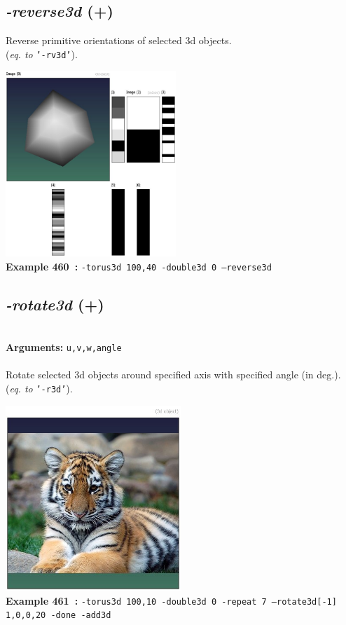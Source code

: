 \documentclass[a4paper,11pt,twoside]{book}
\begin{document}
\subsection{\emph{-reverse3d} (+)}\vspace*{-0.5em}
Reverse primitive orientations of selected 3d objects.
~\\(\emph{eq. to} {\small \texttt{'-rv3d'}}).
\begin{center}\includegraphics[keepaspectratio=true,height=7cm,width=\textwidth]{img/gmic_def460.jpg}\\
{\footnotesize \textbf{Example 460~:} \texttt{-torus3d 100,40 -double3d 0 --reverse3d}}
\end{center}

\subsection{\emph{-rotate3d} (+)}\vspace*{-0.5em}
~\\\textbf{Arguments: } 
{\small \texttt{u,v,w,angle}}\\~\\
Rotate selected 3d objects around specified axis with specified angle (in deg.).
~\\(\emph{eq. to} {\small \texttt{'-r3d'}}).
\begin{center}\includegraphics[keepaspectratio=true,height=7cm,width=\textwidth]{img/gmic_def461.jpg}\\
{\footnotesize \textbf{Example 461~:} \texttt{-torus3d 100,10 -double3d 0 -repeat 7 --rotate3d[-1] 1,0,0,20 -done -add3d}}
\end{center}
\end{document}
